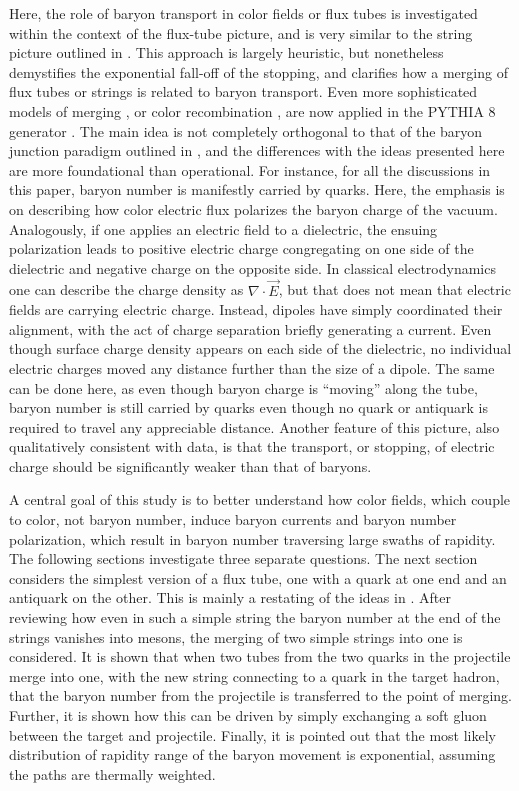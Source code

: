 \documentclass[aps, prc, 12pt, nofootinbib, showpacs, superscriptaddress, tightenlines, groupedaddress]{revtex4-2}
\begin{document}
Here, the role of baryon transport in color fields or flux tubes is investigated within the context of the flux-tube picture, and is very similar to the string picture outlined in \cite{Vance:1997th}. This approach is largely heuristic, but nonetheless demystifies the exponential fall-off of the stopping, and clarifies how a merging of flux tubes or strings is related to baryon transport. Even more sophisticated models of merging \cite{Sjostrand:2004pf}, or color recombination \cite{Christiansen:2015yqa}, are now applied in the PYTHIA 8 generator \cite{Bierlich:2022pfr}. The main idea is not completely orthogonal to that of the baryon junction paradigm outlined in \cite{Kharzeev:1996sq}, and the differences with the ideas presented here are more foundational than operational. For instance, for all the discussions in this paper, baryon number is manifestly carried by quarks. Here, the emphasis is on describing how color electric flux polarizes the baryon charge of the vacuum. Analogously, if one applies an electric field to a dielectric, the ensuing polarization leads to positive electric charge congregating on one side of the dielectric and negative charge on the opposite side. In classical electrodynamics one can describe the charge density as $\nabla\cdot\vec{E}$, but that does not mean that electric fields are carrying electric charge. Instead, dipoles have simply coordinated their alignment, with the act of charge separation briefly generating a current. Even though surface charge density appears on each side of the dielectric, no individual electric charges moved any distance further than the size of a dipole. The same can be done here, as even though baryon charge is ``moving'' along the tube, baryon number is still carried by quarks even though no quark or antiquark is required to travel any appreciable distance. Another feature of this picture, also qualitatively consistent with data, is that the transport, or stopping, of electric charge should be significantly weaker than that of baryons.

A central goal of this study is to better understand how color fields, which couple to color, not baryon number, induce baryon currents and baryon number polarization, which result in baryon number traversing large swaths of rapidity. The following sections investigate three separate questions. The next section considers the simplest version of a flux tube, one with a quark at one end and an antiquark on the other. This is mainly a restating of the ideas in \cite{Vance:1997th}. After reviewing how even in such a simple string the baryon number at the end of the strings vanishes into mesons, the merging of two simple strings into one is considered. It is shown that when two tubes from the two quarks in the projectile merge into one, with the new string connecting to a quark in the target hadron, that the baryon number from the projectile is transferred to the point of merging. Further, it is shown how this can be driven by simply exchanging a soft gluon between the target and projectile. Finally, it is pointed out that the most likely distribution of rapidity range of the baryon movement is exponential, assuming the paths are thermally weighted.
\end{document}
